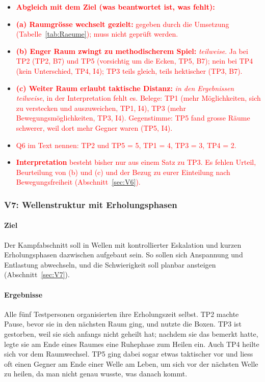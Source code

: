 \documentclass[../Main.tex]{subfiles}
\begin{document}
\begin{itemize}[leftmargin=1.5cm]
    \item \textcolor{red}{\textbf{Abgleich mit dem Ziel (was beantwortet ist, was fehlt):}}
    \item \textcolor{red}{\textbf{(a) Raumgrösse wechselt gezielt:} gegeben durch die Umsetzung (Tabelle~\ref{tab:Raeume}); muss nicht geprüft werden.}
    \item \textcolor{red}{\textbf{(b) Enger Raum zwingt zu methodischerem Spiel:} \emph{teilweise}. Ja bei TP2 (TP2, B7) und TP5 (vorsichtig um die Ecken, TP5, B7); nein bei TP4 (kein Unterschied, TP4, I4); TP3 teils gleich, teils hektischer (TP3, B7).}
    \item \textcolor{red}{\textbf{(c) Weiter Raum erlaubt taktische Distanz:} \emph{in den Ergebnissen teilweise}, in der Interpretation fehlt es. Belege: TP1 (mehr Möglichkeiten, sich zu verstecken und auszuweichen, TP1, I4), TP3 (mehr Bewegungsmöglichkeiten, TP3, I4). Gegenstimme: TP5 fand grosse Räume schwerer, weil dort mehr Gegner waren (TP5, I4).}
    \item \textcolor{red}{Q6 im Text nennen: TP2 und TP5 = 5, TP1 = 4, TP3 = 3, TP4 = 2.}
    \item \textcolor{red}{\textbf{Interpretation} besteht bisher nur aus einem Satz zu TP3. Es fehlen Urteil, Beurteilung von (b) und (c) und der Bezug zu eurer Einteilung nach Bewegungsfreiheit (Abschnitt~\ref{sec:V6}).}
\end{itemize}

\subsubsection{V7: Wellenstruktur mit Erholungsphasen}

\paragraph{Ziel}
Der Kampfabschnitt soll in Wellen mit kontrollierter Eskalation und kurzen Erholungsphasen dazwischen aufgebaut sein. So sollen sich Anspannung und Entlastung abwechseln, und die Schwierigkeit soll planbar ansteigen (Abschnitt~\ref{sec:V7}).

\paragraph{Ergebnisse}
Alle fünf Testpersonen organisierten ihre Erholungszeit selbst. TP2 machte Pause, bevor sie in den nächsten Raum ging, und nutzte die Boxen. TP3 ist gestorben, weil sie sich anfangs nicht geheilt hat; nachdem sie das bemerkt hatte, legte sie am Ende eines Raumes eine Ruhephase zum Heilen ein. Auch TP4 heilte sich vor dem Raumwechsel. TP5 ging dabei sogar etwas taktischer vor und liess oft einen Gegner am Ende einer Welle am Leben, um sich vor der nächsten Welle zu heilen, da man nicht genau wusste, was danach kommt.
\end{document}
